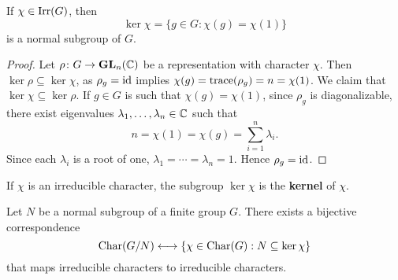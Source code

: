 \begin{proposition}
If $\chi\in\operatorname{Irr}(G)$, then 
\[
\ker\chi=\{g\in G:\chi(g)=\chi(1)\}
\]
is a normal subgroup of $G$. 
\end{proposition}

\begin{proof}
Let $\rho\colon G\to\mathbf{GL}_n(\mathbb{C})$ be a representation with character $\chi$. Then 
$\ker\rho\subseteq\ker\chi$, as $\rho_g=\operatorname{id}$ implies 
$\chi(g)=\operatorname{trace}(\rho_g)=n=\chi(1)$. We claim that  
$\ker\chi\subseteq\ker\rho$. If $g\in G$ is such that $\chi(g)=\chi(1)$, since 
$\rho_g$ is diagonalizable, there exist eigenvalues $\lambda_1,\dots,\lambda_n\in\mathbb{C}$ such that
\[
n=\chi(1)=\chi(g)=\sum_{i=1}^n\lambda_i.
\]
Since each $\lambda_i$ is a root of one,  
$\lambda_1=\cdots=\lambda_n=1$. Hence $\rho_g=\operatorname{id}$. 
\end{proof}

If $\chi$ is an irreducible character, the subgroup $\ker\chi$ 
is the \textbf{kernel} of $\chi$. 

\begin{theorem}
Let $N$ be a normal subgroup of a finite group $G$. There exists
a bijective correspondence 
\[
\operatorname{Char}(G/N) \longleftrightarrow \{\chi\in\operatorname{Char}(G): 
N\subseteq\ker\chi\}
\]
that maps irreducible characters to irreducible characters.
\end{theorem}

